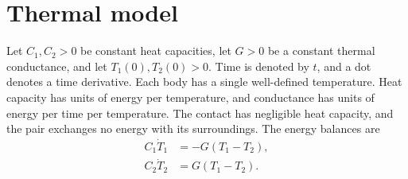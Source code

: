 \section{Thermal model}
Let $C_1,C_2>0$ be constant heat capacities, let $G>0$ be a constant thermal conductance, and let $T_1(0),T_2(0)>0$. Time is denoted by $t$, and a dot denotes a time derivative. Each body has a single well-defined temperature. Heat capacity has units of energy per temperature, and conductance has units of energy per time per temperature. The contact has negligible heat capacity, and the pair exchanges no energy with its surroundings. The energy balances are
\begin{align}
 C_1\dot T_1&=-G(T_1-T_2),\label{eq:balance1}\\
 C_2\dot T_2&= G(T_1-T_2).\label{eq:balance2}
\end{align}
